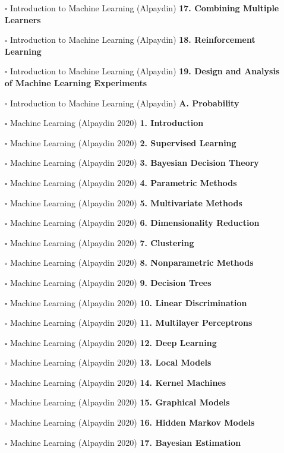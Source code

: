 \documentclass[a4, landscape, 12pt]{article}
\newcommand{\checkbox}{$\square$}%
\begin{document}
\begin{itemize}
{}
\item [\checkbox]  Introduction to Machine Learning (Alpaydin) \textbf{ 17. Combining Multiple Learners
}
\item [\checkbox]  Introduction to Machine Learning (Alpaydin) \textbf{ 18. Reinforcement Learning
}
\item [\checkbox]  Introduction to Machine Learning (Alpaydin) \textbf{ 19. Design and Analysis of Machine Learning Experiments
}
\item [\checkbox]  Introduction to Machine Learning (Alpaydin) \textbf{ A. Probability
}
\item [\checkbox]  Machine Learning (Alpaydin 2020) \textbf{ 1. Introduction
}
\item [\checkbox]  Machine Learning (Alpaydin 2020) \textbf{ 2. Supervised Learning
}
\item [\checkbox]  Machine Learning (Alpaydin 2020) \textbf{ 3. Bayesian Decision Theory
}
\item [\checkbox]  Machine Learning (Alpaydin 2020) \textbf{ 4. Parametric Methods
}
\item [\checkbox]  Machine Learning (Alpaydin 2020) \textbf{ 5. Multivariate Methods
}
\item [\checkbox]  Machine Learning (Alpaydin 2020) \textbf{ 6. Dimensionality Reduction
}
\item [\checkbox]  Machine Learning (Alpaydin 2020) \textbf{ 7. Clustering
}
\item [\checkbox]  Machine Learning (Alpaydin 2020) \textbf{ 8. Nonparametric Methods
}
\item [\checkbox]  Machine Learning (Alpaydin 2020) \textbf{ 9. Decision Trees
}
\item [\checkbox]  Machine Learning (Alpaydin 2020) \textbf{ 10. Linear Discrimination
}
\item [\checkbox]  Machine Learning (Alpaydin 2020) \textbf{ 11. Multilayer Perceptrons
}
\item [\checkbox]  Machine Learning (Alpaydin 2020) \textbf{ 12. Deep Learning
}
\item [\checkbox]  Machine Learning (Alpaydin 2020) \textbf{ 13. Local Models
}
\item [\checkbox]  Machine Learning (Alpaydin 2020) \textbf{ 14. Kernel Machines
}
\item [\checkbox]  Machine Learning (Alpaydin 2020) \textbf{ 15. Graphical Models
}
\item [\checkbox]  Machine Learning (Alpaydin 2020) \textbf{ 16. Hidden Markov Models
}
\item [\checkbox]  Machine Learning (Alpaydin 2020) \textbf{ 17. Bayesian Estimation
}
\end{itemize}
\end{document}
